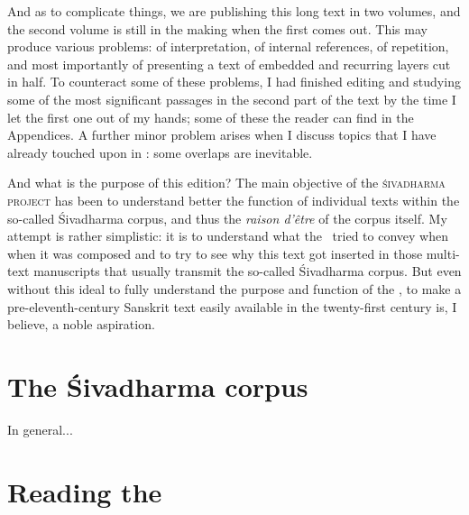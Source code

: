 \documentclass[11pt]{book}
\begin{document}
And as to complicate things, we are publishing this long text
in two volumes, and the second volume is still in the making
when the first comes out. This may produce various problems:
of interpretation, of internal references, of repetition, 
and most importantly of presenting a text of
embedded and recurring layers cut in half. To counteract
some of these problems, I had finished editing and 
studying some of the most significant passages in 
the second part of the text by the time I let the first one
out of my hands; some of these the reader can find in 
the Appendices. A further minor problem arises when
I discuss topics that I have already touched upon in
: some overlaps are inevitable.

And what is the purpose of this edition? The main 
objective of the \textsc{śiva\-dharma project} 
has been to understand better the function of 
individual texts within the so-called Śivadharma corpus,
and thus the \emph{raison d'être} of the corpus itself. 
My attempt is rather simplistic: it is to understand
what the \Vss\ tried to convey when when it was composed and
to try to see why this text got inserted in those multi-text 
manuscripts that usually transmit the so-called Śivadharma corpus.
But even without this ideal to fully understand the purpose
and function of the \Vss, to make a pre-eleventh-century
Sanskrit text easily available in the twenty-first century is,
I believe, a noble aspiration.

\vfill
\pagebreak










\thispagestyle{empty}
\frenchspacing





\section{The Śivadharma corpus}
\fancyhead[LE]{}
\fancyhead[RE]{}
\fancyhead[LO]{}
\fancyhead[RO]{}

In general...

\section{Reading the \Vsssc}
\end{document}
